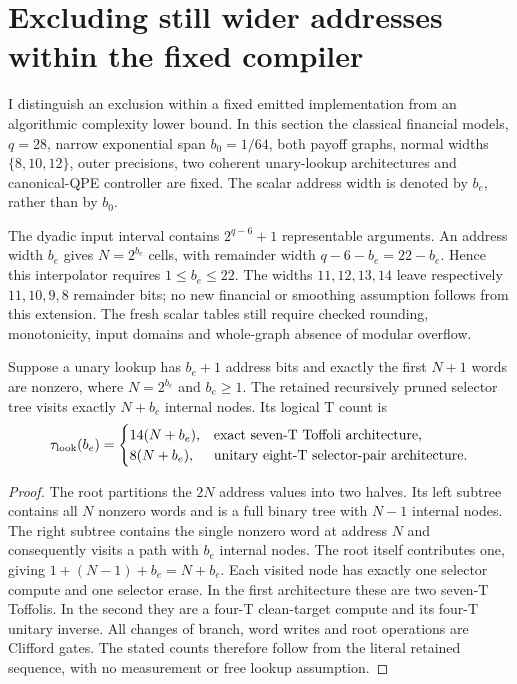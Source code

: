 \section{Excluding still wider addresses within the fixed compiler}
\label{sec:raw-wider-address-exclusion}

I distinguish an exclusion within a fixed emitted implementation from an
algorithmic complexity lower bound. In this section the classical financial
models, $q=28$, narrow exponential span $b_0=1/64$, both payoff graphs,
normal widths $\{8,10,12\}$, outer precisions, two coherent unary-lookup
architectures and canonical-QPE controller are fixed. The scalar address
width is denoted by $b_e$, rather than by $b_0$.

The dyadic input interval contains $2^{q-6}+1$ representable arguments.
An address width $b_e$ gives $N=2^{b_e}$ cells, with remainder width
$q-6-b_e=22-b_e$. Hence this interpolator requires $1\leq b_e\leq22$.
The widths $11,12,13,14$ leave respectively $11,10,9,8$ remainder bits;
no new financial or smoothing assumption follows from this extension.
The fresh scalar tables still require checked rounding, monotonicity,
input domains and whole-graph absence of modular overflow.

\begin{lemma}
\label{lem:raw-selector-count}
Suppose a unary lookup has $b_e+1$ address bits and exactly the first
$N+1$ words are nonzero, where $N=2^{b_e}$ and $b_e\geq1$.
The retained recursively pruned selector tree visits exactly $N+b_e$
internal nodes. Its logical T count is
\[
 \tau_{\rm look}(b_e)=
 \begin{cases}
 14(N+b_e),&\text{exact seven-T Toffoli architecture},\\
 8(N+b_e),&\text{unitary eight-T selector-pair architecture}.
 \end{cases}
\]
\end{lemma}
\begin{proof}
The root partitions the $2N$ address values into two halves. Its left
subtree contains all $N$ nonzero words and is a full binary tree with
$N-1$ internal nodes. The right subtree contains the single nonzero word
at address $N$ and consequently visits a path with $b_e$ internal nodes.
The root itself contributes one, giving $1+(N-1)+b_e=N+b_e$.
Each visited node has exactly one selector compute and one selector
erase. In the first architecture these are two seven-T Toffolis. In the
second they are a four-T clean-target compute and its four-T unitary
inverse. All changes of branch, word writes and root operations are
Clifford gates. The stated counts therefore follow from the literal
retained sequence, with no measurement or free lookup assumption.
\end{proof}


